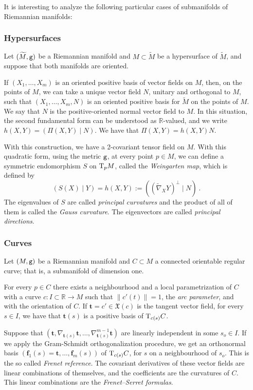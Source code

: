 \documentclass[12pt]{report}
\def\vf{\mathfrak X}
\def\Real{\mathbb{R}}
\def\Tan{{\rm T}}
\begin{document}
It is interesting to analyze the following particular cases of submanifolds of Riemannian manifolds:

\subsubsection{Hypersurfaces} 

Let $(\widetilde M,{\tt g})$ be a Riemannian manifold and 
$M\subset\widetilde M $ be a hypersurface of $\widetilde M$,
and suppose that both manifolds are oriented.
 
If $(X_1,\ldots,X_m)$ is an oriented positive basis of vector fields on $M$,
then, on the points of $M$, we can take a unique vector field $N$, 
unitary and orthogonal to $M$, such that $(X_1,\ldots,X_m, N)$ 
is an oriented positive basis for $\widetilde M$ on the points of $M$. We say that $N$ is the positive-oriented normal vector field to $M$. In this situation, the second fundamental form can be understood as 
$\Real$-valued, and we write $h(X,Y)=(\Pi(X,Y)\mid N)$. 
We have that $\Pi(X,Y)=h(X,Y)N$.

With this construction, we have a 2-covariant tensor field on $M$. 
With this quadratic form, using the metric ${\tt g}$,
at every point $p\in M$, we can define a symmetric endomorphism 
$S$ on $\Tan_pM$, called the {\sl Weingarten map}, which is defined by 
  $$
  (S(X)\mid Y)=h(X,Y):=((\widetilde{\nabla}_XY)^\perp\mid N)\ .
  $$
The eigenvalues of $S$ are called {\sl principal curvatures}
and the product of all of them is called the {\sl Gauss curvature}. 
The eigenvectors are called {\sl principal directions}.  

\subsubsection{Curves}

Let $(M,{\tt g})$ be a Riemannian manifold and $C\subset M$ a connected orientable regular curve; that is, a  submanifold of dimension one.

For every $p\in C$ there exists a neighbourhood and 
a local parametrization of $C$ with a curve $c\colon I\subset\Real\to M$ 
such that $\parallel c'(t)\parallel=1$, the {\sl arc parameter},
and with the orientation of $C$. 
If ${\mathbf t}=c'\in\vf(c)$ is the tangent vector field, for every $s\in I$,
we have that ${\mathbf t}(s)$ is a positive basis of $\Tan_{c(s)}C$. 

Suppose that $({\mathbf t},\nabla_{{\mathbf t}(s)}{\mathbf t},\ldots,\nabla_{{\mathbf t}(s)}^{m-1}{\mathbf t})$ 
are linearly independent in some $s_o\in I$. 
If we apply the Gram-Schmidt orthogonalization procedure, 
we get an orthonormal basis $({\mathbf f}_1(s)={\mathbf t},\ldots,{\mathbf f}_m(s))$ 
of $\Tan_{c(s)}C$, for $s$ on a neighbourhood of $s_o$. 
This is the so called {\sl Frenet reference}.
The covariant derivatives of these vector fields 
are linear combinations of themselves, 
and the coefficients are the curvatures of $C$. 
This linear combinations are the {\sl Frenet--Serret formulas}.
\end{document}
